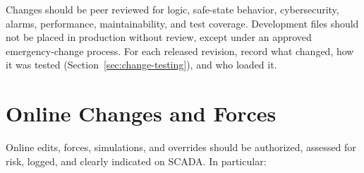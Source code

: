 Changes should be peer reviewed for logic, safe-state behavior, cybersecurity, alarms, performance, maintainability, and test coverage. Development files should not be placed in production without review, except under an approved emergency-change process. For each released revision, record what changed, how it was tested (Section~\ref{sec:change-testing}), and who loaded it.

\section{Online Changes and Forces}\label{sec:online-changes}

Online edits, forces, simulations, and overrides should be authorized, assessed for risk, logged, and clearly indicated on SCADA. In particular:
